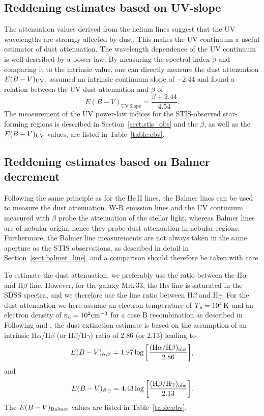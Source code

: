 \documentclass[]{aastex63}
\begin{document}
\subsection{Reddening estimates based on UV-slope}\label{sect:red_uv}
The attenuation values derived from the helium lines suggest that the UV wavelengths are strongly affected by dust. This makes the UV continuum a useful estimator of dust attenuation. The wavelength dependence of the UV continuum  is well described by a power law. By measuring the spectral index $\beta$ and comparing it to the intrinsic value, one can directly measure the dust attenuation ${E(B-V)_{\rm UV}}$. \citet{reddy_mosdef_2015} assumed an intrinsic continuum slope of $-2.44$ and found a relation between the UV dust attenuation and $\beta$ of
\begin{equation}\label{eq:6}
    E(B-V)_{\mathrm{UV\, Slope}} = \frac{\beta + 2.44}{4.54}.
\end{equation}
The measurement of the UV power-law indices for the STIS-observed star-forming regions is described in Section~\ref{sect:stis_obs} and the $\beta$, as well as the  ${E(B-V)_{\rm UV}}$ values, are listed in Table~\ref{table:ebv}.

\subsection{Reddening estimates based on Balmer decrement}\label{sect:red_balmer}
Following the same principle as for the He\,II lines, the Balmer lines can be used to measure the dust attenuation. 
W-R emission lines and the UV continuum measured with $\beta$ probe the attenuation of the stellar light, whereas Balmer lines are of nebular origin, hence they probe dust attenuation in nebular regions. Furthermore, the Balmer line measurements are not always taken in the same aperture as the STIS observations, as described in detail in Section~\ref{sect:balmer_line}, and a comparison should therefore be taken with care.

To estimate the dust attenuation, we preferably use the ratio between the H$\alpha$ and H$\beta$ line. However, for the galaxy Mrk\,33, the H$\alpha$ line is saturated in the SDSS spectra, and we therefore use the line ratio between H$\beta$ and H$\gamma$. 
For the dust attenuation we here assume an electron temperature of $T{\rm _e=10^4\,K}$ and an electron density of $n_{\rm e} = 10^2 {\rm cm^{-3}}$ for a case B recombination as described in \citet{osterbrock_astrophysics_1989}. 
Following \citet{momcheva_nebular_2013} and \citet{dominguez_dust_2013}, the dust extinction estimate is based on the assumption of an intrinsic H$\alpha$/H$\beta$ (or  H$\beta$/H$\gamma$) ratio of $2.86$ (or $2.13$) leading to 
\begin{equation}\label{eq:ebv_alpha_beta}
    E(B-V)_{\alpha,\beta} = {\rm 1.97\, log \left[ \frac{(H\alpha / H\beta)_{obs}}{2.86}\right]},
\end{equation}
and
\begin{equation}\label{eq:ebv_beta_gama}
    E(B-V)_{\beta,\gamma} = {\rm 4.43\, log \left[ \frac{(H\beta / H\gamma)_{obs}}{2.13}\right]}.
\end{equation}
The ${E(B-V)_{\rm Balmer}}$ values are listed in Table~\ref{table:ebv}.
%

%
\end{document}
